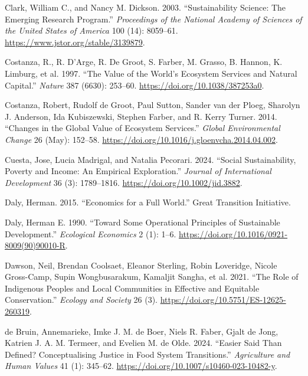 \documentclass[
  a4paper,
  openany]{book}
\newlength{\cslhangindent}
\newenvironment{CSLReferences}[2] %
 {\begin{list}{}{%
  \setlength{\itemindent}{0pt}
  \setlength{\leftmargin}{0pt}
  \setlength{\parsep}{0pt}
  \ifodd #1
   \setlength{\leftmargin}{\cslhangindent}
   \setlength{\itemindent}{-1\cslhangindent}
  \fi
  \setlength{\itemsep}{#2\baselineskip}}}
 {\end{list}}
\begin{document}
\begin{CSLReferences}{1}{0}
Clark, William C., and Nancy M. Dickson. 2003. {``Sustainability
{Science}: {The Emerging Research Program}.''} \emph{Proceedings of the
National Academy of Sciences of the United States of America} 100 (14):
8059--61. \url{https://www.jstor.org/stable/3139879}.

Costanza, R., R. D'Arge, R. De Groot, S. Farber, M. Grasso, B. Hannon,
K. Limburg, et al. 1997. {``The {Value} of the {World}'s {Ecosystem
Services} and {Natural Capital}.''} \emph{Nature} 387 (6630): 253--60.
\url{https://doi.org/10.1038/387253a0}.

Costanza, Robert, Rudolf de Groot, Paul Sutton, Sander van der Ploeg,
Sharolyn J. Anderson, Ida Kubiszewski, Stephen Farber, and R. Kerry
Turner. 2014. {``Changes in the Global Value of Ecosystem Services.''}
\emph{Global Environmental Change} 26 (May): 152--58.
\url{https://doi.org/10.1016/j.gloenvcha.2014.04.002}.

Cuesta, Jose, Lucia Madrigal, and Natalia Pecorari. 2024. {``Social
Sustainability, Poverty and Income: {An} Empirical Exploration.''}
\emph{Journal of International Development} 36 (3): 1789--1816.
\url{https://doi.org/10.1002/jid.3882}.

Daly, Herman. 2015. {``Economics for a {Full World}.''} Great Transition
Initiative.

Daly, Herman E. 1990. {``Toward Some Operational Principles of
Sustainable Development.''} \emph{Ecological Economics} 2 (1): 1--6.
\url{https://doi.org/10.1016/0921-8009(90)90010-R}.

Dawson, Neil, Brendan Coolsaet, Eleanor Sterling, Robin Loveridge,
Nicole Gross-Camp, Supin Wongbusarakum, Kamaljit Sangha, et al. 2021.
{``The Role of {Indigenous} Peoples and Local Communities in Effective
and Equitable Conservation.''} \emph{Ecology and Society} 26 (3).
\url{https://doi.org/10.5751/ES-12625-260319}.

de Bruin, Annemarieke, Imke J. M. de Boer, Niels R. Faber, Gjalt de
Jong, Katrien J. A. M. Termeer, and Evelien M. de Olde. 2024. {``Easier
Said Than Defined? {Conceptualising} Justice in Food System
Transitions.''} \emph{Agriculture and Human Values} 41 (1): 345--62.
\url{https://doi.org/10.1007/s10460-023-10482-y}.


\end{CSLReferences}
\end{document}
